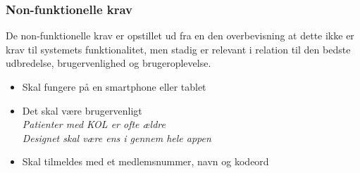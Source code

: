 \subsubsection{Non-funktionelle krav}
De non-funktionelle krav er opstillet ud fra en den overbevisning at dette ikke er krav til systemets funktionalitet, men stadig er relevant i relation til den bedste udbredelse, brugervenlighed og brugeroplevelse. 

\begin{itemize}
\item Skal fungere på en smartphone eller tablet 
\item Det skal være brugervenligt
	\\
	\textit{Patienter med KOL er ofte ældre}
	\\ 
	\textit{Designet skal være ens i gennem hele appen} 
	
\item Skal tilmeldes med et medlemsnummer, navn og kodeord
\end{itemize}